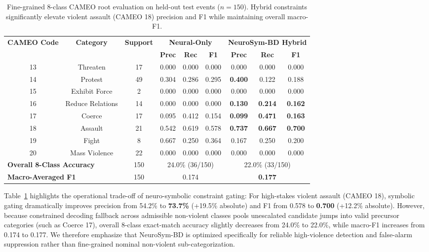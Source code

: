 \documentclass[11pt,a4paper]{article}
\begin{document}
\begin{table}[h]
\centering
\small
\caption{Fine-grained 8-class CAMEO root evaluation on held-out test events ($n=150$). Hybrid constraints significantly elevate violent assault (CAMEO 18) precision and F1 while maintaining overall macro-F1.}
\label{tab:multiclass}
\begin{tabular}{ccccccccc}
\toprule
\multirow{2}{*}{\textbf{CAMEO Code}} & \multirow{2}{*}{\textbf{Category}} & \multirow{2}{*}{\textbf{Support}} & \multicolumn{3}{c}{\textbf{Neural-Only}} & \multicolumn{3}{c}{\textbf{NeuroSym-BD Hybrid}} \\
\cmidrule(lr){4-6} \cmidrule(lr){7-9}
& & & \textbf{Prec} & \textbf{Rec} & \textbf{F1} & \textbf{Prec} & \textbf{Rec} & \textbf{F1} \\
\midrule
13 & Threaten & 17 & 0.000 & 0.000 & 0.000 & 0.000 & 0.000 & 0.000 \\
14 & Protest & 49 & 0.304 & 0.286 & 0.295 & \textbf{0.400} & 0.122 & 0.188 \\
15 & Exhibit Force & 2 & 0.000 & 0.000 & 0.000 & 0.000 & 0.000 & 0.000 \\
16 & Reduce Relations & 14 & 0.000 & 0.000 & 0.000 & \textbf{0.130} & \textbf{0.214} & \textbf{0.162} \\
17 & Coerce & 17 & 0.095 & 0.412 & 0.154 & \textbf{0.099} & \textbf{0.471} & \textbf{0.163} \\
18 & Assault & 21 & 0.542 & 0.619 & 0.578 & \textbf{0.737} & \textbf{0.667} & \textbf{0.700} \\
19 & Fight & 8 & 0.667 & 0.250 & 0.364 & 0.167 & 0.250 & 0.200 \\
20 & Mass Violence & 22 & 0.000 & 0.000 & 0.000 & 0.000 & 0.000 & 0.000 \\
\midrule
\multicolumn{2}{l}{\textbf{Overall 8-Class Accuracy}} & 150 & \multicolumn{3}{c}{24.0\% (36/150)} & \multicolumn{3}{c}{22.0\% (33/150)} \\
\multicolumn{2}{l}{\textbf{Macro-Averaged F1}} & 150 & \multicolumn{3}{c}{0.174} & \multicolumn{3}{c}{\textbf{0.177}} \\
\bottomrule
\end{tabular}
\end{table}

\noindent
Table~\ref{tab:multiclass} highlights the operational trade-off of neuro-symbolic constraint gating:
For high-stakes violent assault (CAMEO 18), symbolic gating dramatically improves precision from 54.2\% to \textbf{73.7\%} (+19.5\% absolute) and F1 from 0.578 to \textbf{0.700} (+12.2\% absolute).
However, because constrained decoding fallback across admissible non-violent classes pools unescalated candidate jumps into valid precursor categories (such as Coerce 17), overall 8-class exact-match accuracy slightly decreases from 24.0\% to 22.0\%, while macro-F1 increases from 0.174 to 0.177.
We therefore emphasize that NeuroSym-BD is optimized specifically for reliable high-violence detection and false-alarm suppression rather than fine-grained nominal non-violent sub-categorization.
\end{document}
